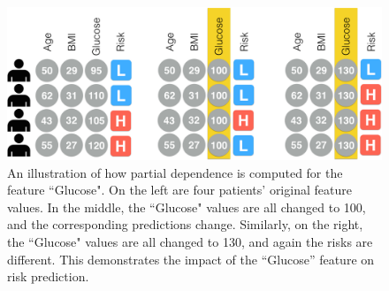 
\begin{figure}
\centering
\includegraphics[width=0.90\linewidth]{prospector/partial-dependence-explanation} %
\caption{
An illustration of how partial dependence is computed for the feature ``Glucose".  On the left are four patients' original feature values.  In the middle, the ``Glucose" values are all changed to 100, and the corresponding predictions change.  Similarly, on the right, the ``Glucose" values are all changed to 130, and again the risks are different.  This demonstrates the impact of the ``Glucose'' feature on risk prediction.
}
\label{figs:pdexplain}
\end{figure}